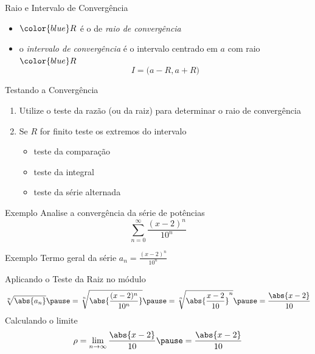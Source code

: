 \begin{frame}{Raio e Intervalo de Convergência}
  \begin{itemize}[<+->]
    \item \({\color{blue}R}\) é o de \emph{raio de convergência} \\[\baselineskip]
    \item o \emph{intervalo de convergência} é o intervalo centrado em \(a\) com raio ${\color{blue}R}$
          \[
            I = \big( a-R, a+R \big)
          \]
  \end{itemize}

\end{frame}

\begin{frame}{Testando a Convergência}
  \begin{enumerate}[<+->]
  \item Utilize o teste da razão (ou da raiz) para determinar o raio de convergência
  \vspace{\baselineskip}
  \item Se \(R\) for finito teste os extremos do intervalo
        \begin{itemize}
          \item teste da comparação
          \item teste da integral
          \item teste da série alternada
        \end{itemize}
  \end{enumerate}
\end{frame}

\addtocounter{exemplo}{1}
\begin{frame}{Exemplo \theexemplo}
  Analise a convergência da série de potências
  \[
    \sum_{n=0}^\infty \frac{(x-2)^n}{10^n}
  \]
\end{frame}

\begin{frame}{Exemplo \theexemplo}
  Termo geral da série
  \(
    a_n = \frac{(x-2)^n}{10^n}
  \)

  \pause
  \vspace{\baselineskip}
  Aplicando o Teste da Raiz no módulo
  \pause
  \[
    \sqrt[n]{\abs{a_n}}                    \pause =
    \sqrt[n]{\abs{\frac{(x-2)^n}{10^n}}}   \pause =
    \sqrt[n]{\abs{\frac{x-2}{10}}^n}       \pause =
    \frac{\abs{x-2}}{10}
  \]
  \pause
  Calculando o limite
  \[
     \rho
     = \lim_{n\to\infty} \frac{\abs{x-2}}{10}
     \pause
     = \frac{\abs{x-2}}{10}
  \]
\end{frame}

